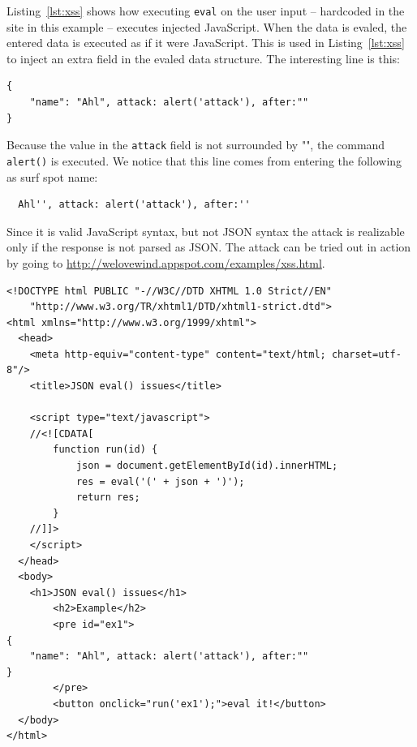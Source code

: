 Listing~\ref{lst:xss} shows how executing \verb|eval| on the user input --
hardcoded in the site in this example -- executes injected JavaScript. When the
data is evaled, the entered data is executed as if it were JavaScript. This is
used in Listing~\ref{lst:xss} to inject an extra field in the evaled data
structure. The interesting line is this:
\begin{verbatim}
{
	"name": "Ahl", attack: alert('attack'), after:""
}  
\end{verbatim}
Because the value in the \verb|attack| field is not surrounded by "", the command
\verb|alert()| is executed. We notice that this line comes from entering the
following as surf spot name:
\begin{verbatim}
  Ahl'', attack: alert('attack'), after:''
\end{verbatim}

Since it is valid JavaScript syntax, but not JSON syntax the attack is realizable
only if the response is not parsed as JSON. The attack can be tried out in action
by going to \url{http://welovewind.appspot.com/examples/xss.html}.

\begin{lstlisting}[caption=xss.html,label=lst:xss]
<!DOCTYPE html PUBLIC "-//W3C//DTD XHTML 1.0 Strict//EN"
    "http://www.w3.org/TR/xhtml1/DTD/xhtml1-strict.dtd">
<html xmlns="http://www.w3.org/1999/xhtml">
  <head>
    <meta http-equiv="content-type" content="text/html; charset=utf-8"/>
	<title>JSON eval() issues</title>
    
    <script type="text/javascript">
    //<![CDATA[
		function run(id) {
			json = document.getElementById(id).innerHTML;
			res = eval('(' + json + ')');
			return res;
		}
    //]]>
    </script>
  </head>
  <body>
  	<h1>JSON eval() issues</h1>
		<h2>Example</h2>
		<pre id="ex1">
{
	"name": "Ahl", attack: alert('attack'), after:""
}
		</pre>
		<button onclick="run('ex1');">eval it!</button>
  </body>
</html>
\end{lstlisting}
